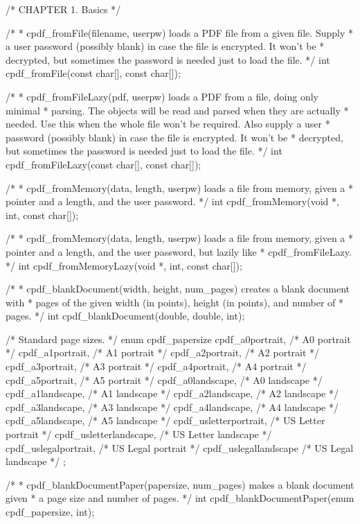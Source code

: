 /* CHAPTER 1. Basics */

/*
 * cpdf_fromFile(filename, userpw) loads a PDF file from a given file. Supply
 * a user password (possibly blank) in case the file is encrypted. It won't be
 * decrypted, but sometimes the password is needed just to load the file.
 */
int cpdf_fromFile(const char[], const char[]);

/*
 * cpdf_fromFileLazy(pdf, userpw) loads a PDF from a file, doing only minimal
 * parsing. The objects will be read and parsed when they are actually
 * needed. Use this when the whole file won't be required. Also supply a user
 * password (possibly blank) in case the file is encrypted. It won't be
 * decrypted, but sometimes the password is needed just to load the file.
 */
int cpdf_fromFileLazy(const char[], const char[]);

/*
 * cpdf_fromMemory(data, length, userpw) loads a file from memory, given a
 * pointer and a length, and the user password.
 */
int cpdf_fromMemory(void *, int, const char[]);

/*
 * cpdf_fromMemory(data, length, userpw) loads a file from memory, given a
 * pointer and a length, and the user password, but lazily like
 * cpdf_fromFileLazy.
 */
int cpdf_fromMemoryLazy(void *, int, const char[]);

/*
 * cpdf_blankDocument(width, height, num_pages) creates a blank document with
 * pages of the given width (in points), height (in points), and number of
 * pages.
 */
int cpdf_blankDocument(double, double, int);

/* Standard page sizes. */
enum cpdf_papersize {
  cpdf_a0portrait,        /* A0 portrait */
  cpdf_a1portrait,        /* A1 portrait */
  cpdf_a2portrait,        /* A2 portrait */
  cpdf_a3portrait,        /* A3 portrait */
  cpdf_a4portrait,        /* A4 portrait */
  cpdf_a5portrait,        /* A5 portrait */
  cpdf_a0landscape,       /* A0 landscape */
  cpdf_a1landscape,       /* A1 landscape */
  cpdf_a2landscape,       /* A2 landscape */
  cpdf_a3landscape,       /* A3 landscape */
  cpdf_a4landscape,       /* A4 landscape */
  cpdf_a5landscape,       /* A5 landscape */
  cpdf_usletterportrait,  /* US Letter portrait */
  cpdf_usletterlandscape, /* US Letter landscape */
  cpdf_uslegalportrait,   /* US Legal portrait */
  cpdf_uslegallandscape   /* US Legal landscape */
};

/*
 * cpdf_blankDocumentPaper(papersize, num_pages) makes a blank document given
 * a page size and number of pages.
 */
int cpdf_blankDocumentPaper(enum cpdf_papersize, int);

